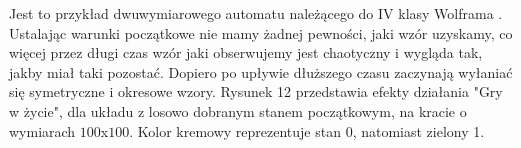 \documentclass[a4paper,12pt]{article}
\begin{document}
Jest to przykład dwuwymiarowego automatu należącego do IV klasy Wolframa \cite{hill}. Ustalając warunki początkowe nie mamy żadnej pewności, jaki wzór uzyskamy, co więcej przez długi czas wzór jaki obserwujemy jest chaotyczny i wygląda tak, jakby miał taki pozostać. Dopiero po upływie dłuższego czasu zaczynają wyłaniać się symetryczne i okresowe wzory.  Rysunek 12 przedstawia efekty działania "Gry w życie", dla układu z losowo dobranym stanem początkowym, na kracie o wymiarach $100$x$100$. Kolor kremowy reprezentuje stan 0, natomiast zielony 1. 
\begin{figure}[!htb]
\centering
{}
\quad
{}
\quad
{}
\quad
{}
\quad
\subfloat[Układ stabilny, widoczna zmiana przy wzorach oscylujących, $t=426$]{\label{odnosnik}
}
\end{figure}
\end{document}
